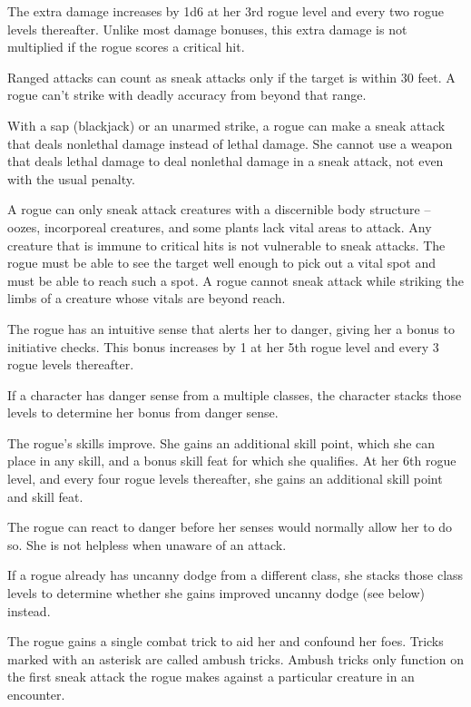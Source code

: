 The extra damage increases by 1d6 at her 3rd rogue level and every two rogue levels thereafter. Unlike most damage bonuses, this extra damage is not multiplied if the rogue scores a critical hit.

\par Ranged attacks can count as sneak attacks only if the target is within 30 feet. A rogue can't strike with deadly accuracy from beyond that range.

With a sap (blackjack) or an unarmed strike, a rogue can make a sneak attack that deals nonlethal damage instead of lethal damage. She cannot use a weapon that deals lethal damage to deal nonlethal damage in a sneak attack, not even with the usual  penalty.

A rogue can only sneak attack creatures with a discernible body structure -- oozes, incorporeal creatures, and some plants lack vital areas to attack. Any creature that is immune to critical hits is not vulnerable to sneak attacks. The rogue must be able to see the target well enough to pick out a vital spot and must be able to reach such a spot. A rogue cannot sneak attack while striking the limbs of a creature whose vitals are beyond reach.

 The rogue has an intuitive sense that alerts her to danger, giving her a  bonus to initiative checks. This bonus increases by 1 at her 5th rogue level and every 3 rogue levels thereafter.
\par If a character has danger sense from a multiple classes, the character stacks those levels to determine her bonus from danger sense.

 The rogue's skills improve. She gains an additional skill point, which she can place in any skill, and a bonus skill feat for which she qualifies. At her 6th rogue level, and every four rogue levels thereafter, she gains an additional skill point and skill feat.

 The rogue can react to danger before her senses would normally allow her to do so. She is not helpless when unaware of an attack.

If a rogue already has uncanny dodge from a different class, she stacks those class levels to determine whether she gains improved uncanny dodge (see below) instead.

 The rogue gains a single combat trick to aid her and confound her foes. Tricks marked with an asterisk are called ambush tricks. Ambush tricks only function on the first sneak attack the rogue makes against a particular creature in an encounter.

